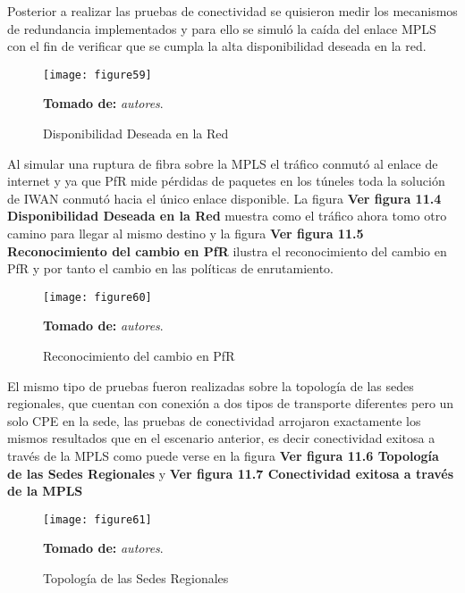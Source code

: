 Posterior a realizar las pruebas de conectividad se quisieron medir los mecanismos de redundancia implementados y para ello se simuló la caída del enlace MPLS con el fin de verificar que se cumpla la alta disponibilidad deseada en la red.


\begin{figure}[htbp]
  \centering
    {\texttt{[image: figure59]}}%
  \caption{\footnotesize{ Disponibilidad Deseada en la Red}}
  \footnotesize{\textbf{Tomado de:} \textit{autores}.}
  \label{fig:fig2subfig}
\end{figure}

Al simular una ruptura de fibra sobre la MPLS el tráfico conmutó al enlace de internet y ya que PfR mide pérdidas de paquetes en los túneles toda la solución de IWAN conmutó hacia el único enlace disponible. La figura \textbf{Ver figura 11.4 Disponibilidad Deseada en la Red} muestra como el tráfico ahora tomo otro camino para llegar al mismo destino y la figura \textbf{Ver figura 11.5 Reconocimiento del cambio en PfR} ilustra el reconocimiento del cambio en PfR y por tanto el cambio en las políticas de enrutamiento.
 
 \begin{figure}[htbp]
  \centering
    {\texttt{[image: figure60]}}%
  \caption{ \footnotesize{Reconocimiento del cambio en PfR}}
  \footnotesize{\textbf{Tomado de:} \textit{autores}.}
  \label{fig:fig2subfig}
\end{figure}

El mismo tipo de pruebas fueron realizadas sobre la topología de las sedes regionales, que cuentan con conexión a dos tipos de transporte diferentes pero un solo CPE en la sede, las pruebas de conectividad arrojaron exactamente los mismos resultados que en el escenario anterior, es decir conectividad exitosa a través de la MPLS como puede verse en la figura \textbf{Ver figura 11.6 Topología de las Sedes Regionales} y \textbf{Ver figura 11.7 Conectividad exitosa a través de la MPLS}

\begin{figure}[htbp]
  \centering
    {\texttt{[image: figure61]}}%
  \caption{\footnotesize{ Topología de las Sedes Regionales}}
 \footnotesize{ \textbf{Tomado de:} \textit{autores}.}
  \label{fig:fig2subfig}
\end{figure}

